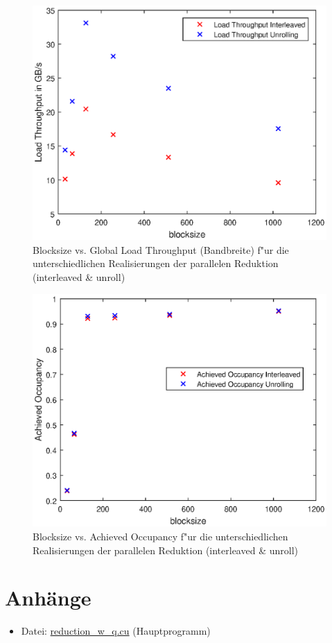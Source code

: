 \documentclass[%
	paper=A4,	%
	pagesize,	%
	DIV=calc,	%
	smallheadings,	%
	ngerman		%
]{scrartcl}
\begin{document}
\begin{figure}
  \centering
  \includegraphics[width=.8\textwidth]{blocksize_vs_load_throughput.eps}
  \caption{Blocksize vs. Global Load Throughput (Bandbreite) f"ur die unterschiedlichen Realisierungen der parallelen Reduktion (interleaved \& unroll)}
\end{figure}

\begin{figure}
  \centering
  \includegraphics[width=.8\textwidth]{blocksize_vs_achieved_occ.eps}
  \caption{Blocksize vs. Achieved Occupancy f"ur die unterschiedlichen Realisierungen der parallelen Reduktion (interleaved \& unroll)}
\end{figure}

\section*{Anhänge}
\begin{itemize}
	\item Datei: \url{reduction_w_q.cu} (Hauptprogramm)
\end{itemize}
\end{document}
